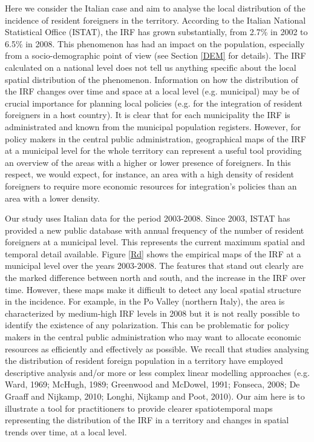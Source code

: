 Here we consider the Italian case and aim to analyse the local distribution of the incidence of resident foreigners in the territory. According to the Italian National Statistical Office (ISTAT), the IRF has grown substantially, from 2.7\% in 2002 to 6.5\% in 2008. This phenomenon has had an impact on the population, especially from a socio-demographic point of view (see Section \ref{DEM} for details). The IRF calculated on a national level does not tell us anything specific about the local spatial distribution of the phenomenon. Information on how the distribution of the IRF changes over time and space at a local level (e.g. municipal) may be of crucial importance for planning local policies (e.g. for the integration of resident foreigners in a host country). It is clear that for each municipality the IRF is administrated and known from the municipal population registers. However, for policy makers in the central public administration, geographical maps of the IRF at a municipal level for the whole territory can represent a useful tool providing an overview of the areas with a higher or lower presence of foreigners. In this respect, we would expect, for instance, an area with a high density of resident foreigners to require more economic resources for integration's policies than an area with a lower density.

Our study uses Italian data for the period 2003-2008. Since 2003, ISTAT has provided a new public database with annual frequency of the number of resident foreigners at a municipal level. This represents the current maximum spatial and temporal detail available. Figure \ref{Rd} shows the empirical maps of the IRF at a municipal level over the years 2003-2008. The features that stand out clearly are the marked difference between north and south, and the increase in the IRF over time. However, these maps make it difficult to detect any local spatial structure in the incidence. For example, in the Po Valley (northern Italy), the area is characterized by medium-high IRF levels in 2008 but it is not really possible to identify the existence of any polarization. This can be problematic for policy makers in the central public administration who may want to allocate economic resources as efficiently and effectively as possible. We recall that studies analysing the distribution of resident foreign population in a territory have employed descriptive analysis and/or more or less complex linear modelling approaches (e.g. Ward, 1969; McHugh, 1989; Greenwood and McDowel, 1991; Fonseca, 2008; De Graaff and Nijkamp, 2010; Longhi, Nijkamp and Poot, 2010). Our aim here is to illustrate a tool for practitioners to provide clearer spatiotemporal maps representing the distribution of the IRF in a territory and changes in spatial trends over time, at a local level. 

